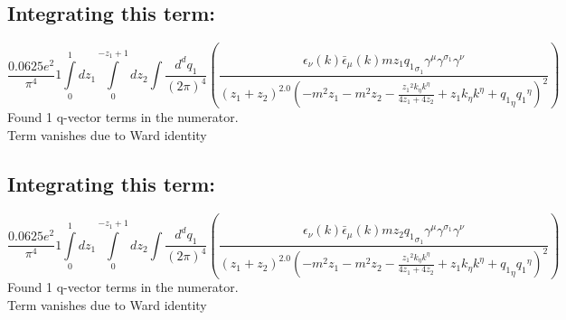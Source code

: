 \subsection*{Integrating this term:}
\begin{dmath}\frac{0.0625 e^{2}}{\pi^{4}}1\int\limits_{ 0 }^{ 1 } d{ z_{ 1 } }\int\limits_{ 0 }^{ - { z_{ 1 } } + 1 } d{ z_{ 2 } }\int\frac{d^d q_1 }{ (2\pi)^4 }\left(\frac{\epsilon_{ \nu }({ k }) \bar{\epsilon}_{ \mu }({ k }) m { z_{ 1 } } { { q_1 }_{ \sigma_1 } } { \gamma^{ \mu } } { \gamma^{ \sigma_1 } } { \gamma^{ \nu } }}{\left({ z_{ 1 } } + { z_{ 2 } }\right)^{2.0} \left(- m^{2} { z_{ 1 } } - m^{2} { z_{ 2 } } - \frac{{ z_{ 1 } }^{2} { { k }_{ \eta } } { { k }^{ \eta } }}{4 { z_{ 1 } } + 4 { z_{ 2 } }} + { z_{ 1 } } { { k }_{ \eta } } { { k }^{ \eta } } + { { q_1 }_{ \eta } } { { q_1 }^{ \eta } }\right)^{2}}\right)\end{dmath}
Found 1 q-vector terms in the numerator.\\
Term vanishes due to Ward identity\\
\subsection*{Integrating this term:}
\begin{dmath}\frac{0.0625 e^{2}}{\pi^{4}}1\int\limits_{ 0 }^{ 1 } d{ z_{ 1 } }\int\limits_{ 0 }^{ - { z_{ 1 } } + 1 } d{ z_{ 2 } }\int\frac{d^d q_1 }{ (2\pi)^4 }\left(\frac{\epsilon_{ \nu }({ k }) \bar{\epsilon}_{ \mu }({ k }) m { z_{ 2 } } { { q_1 }_{ \sigma_1 } } { \gamma^{ \mu } } { \gamma^{ \sigma_1 } } { \gamma^{ \nu } }}{\left({ z_{ 1 } } + { z_{ 2 } }\right)^{2.0} \left(- m^{2} { z_{ 1 } } - m^{2} { z_{ 2 } } - \frac{{ z_{ 1 } }^{2} { { k }_{ \eta } } { { k }^{ \eta } }}{4 { z_{ 1 } } + 4 { z_{ 2 } }} + { z_{ 1 } } { { k }_{ \eta } } { { k }^{ \eta } } + { { q_1 }_{ \eta } } { { q_1 }^{ \eta } }\right)^{2}}\right)\end{dmath}
Found 1 q-vector terms in the numerator.\\
Term vanishes due to Ward identity\\
